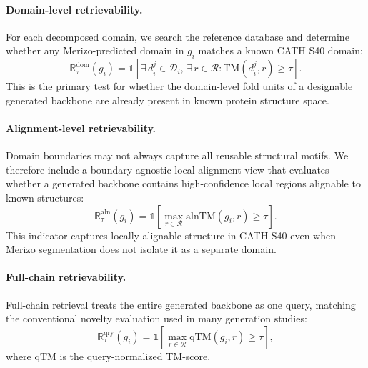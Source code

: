 \documentclass[letterpaper]{article} %
\begin{document}
\paragraph{Domain-level retrievability.}
For each decomposed domain, we search the reference database and determine whether any Merizo-predicted domain in $g_i$ matches a known CATH S40 domain:
\begin{equation}
\mathbb{R}^{\mathrm{dom}}_\tau(g_i) =
\mathbb{1}\!\left[
\exists\, d_i^j \in \mathcal{D}_i,\,
\exists\, r \in \mathcal{R}:
\mathrm{TM}(d_i^j, r) \geq \tau
\right].
\end{equation}
This is the primary test for whether the domain-level fold units of a designable generated backbone are already present in known protein structure space.

\paragraph{Alignment-level retrievability.}
Domain boundaries may not always capture all reusable structural motifs. We therefore include a boundary-agnostic local-alignment view that evaluates whether a generated backbone contains high-confidence local regions alignable to known structures:
\begin{equation}
\mathbb{R}^{\mathrm{aln}}_\tau(g_i) =
\mathbb{1}\!\left[
\max_{r \in \mathcal{R}} \mathrm{alnTM}(g_i, r) \geq \tau
\right].
\end{equation}
This indicator captures locally alignable structure in CATH S40 even when Merizo segmentation does not isolate it as a separate domain.

\paragraph{Full-chain retrievability.}
Full-chain retrieval treats the entire generated backbone as one query, matching the conventional novelty evaluation used in many generation studies:
\begin{equation}
\mathbb{R}^{\mathrm{qry}}_\tau(g_i) =
\mathbb{1}\!\left[
\max_{r \in \mathcal{R}} \mathrm{qTM}(g_i, r) \geq \tau
\right],
\end{equation}
where $\mathrm{qTM}$ is the query-normalized TM-score.
\end{document}
